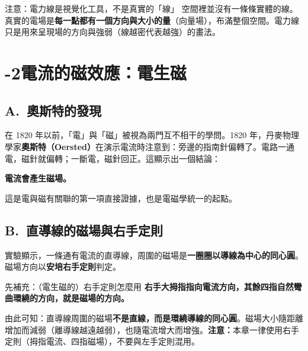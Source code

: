 \documentclass[11pt]{article}
\begin{document}

\begin{補充框}{注意：電力線是視覺化工具，不是真實的「線」}
空間裡並沒有一條條實體的線。真實的電場是\textbf{每一點都有一個方向與大小的量}（向量場），布滿整個空間。電力線只是用來呈現場的方向與強弱（線越密代表越強）的畫法。
\end{補充框}

\section*{-2\quad 電流的磁效應：電生磁}

\subsection*{\sffamily A.\ 奧斯特的發現}

在 1820 年以前，「電」與「磁」被視為兩門互不相干的學問。1820 年，丹麥物理學家\textbf{奧斯特（Oersted）}在演示電流時注意到：旁邊的指南針偏轉了。電路一通電，磁針就偏轉；一斷電，磁針回正。這顯示出一個結論：

\begin{center}
\textbf{電流會產生磁場。}
\end{center}

這是電與磁有關聯的第一項直接證據，也是電磁學統一的起點。

\subsection*{\sffamily B.\ 直導線的磁場與右手定則}

實驗顯示，一條通有電流的直導線，周圍的磁場是\textbf{一圈圈以導線為中心的同心圓}。磁場方向以\textbf{安培右手定則}判定。

\begin{補充框}{先補充：（電生磁的）右手定則怎麼用}
\textbf{右手大拇指指向電流方向，其餘四指自然彎曲環繞的方向，就是磁場的方向。}

由此可知：直導線周圍的磁場\textbf{不是直線，而是環繞導線的同心圓}。磁場大小隨距離增加而減弱（離導線越遠越弱），也隨電流增大而增強。\textbf{注意：}本章一律使用右手定則（拇指電流、四指磁場），不要與左手定則混用。
\end{補充框}

\end{document}
